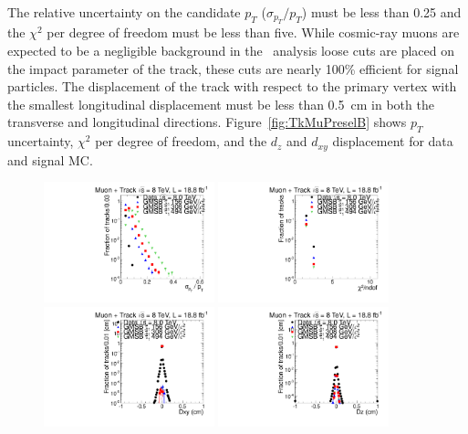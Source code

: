 The relative uncertainty on the candidate $p_T$ ($\sigma_{p_T}/p_T$) must be less than 0.25 and the $\chi^2$ per degree of freedom must be less than five.
While cosmic-ray muons are expected to be a negligible background in the \tktof\ analysis loose cuts are placed on the impact parameter of the track, 
these cuts are nearly 100\% efficient for signal particles.
The displacement of the track with respect to the primary vertex
with the smallest longitudinal displacement must be less than 0.5~cm in both the transverse and longitudinal directions.
Figure~\ref{fig:TkMuPreselB} shows $p_T$ uncertainty, $\chi^2$ per degree of freedom, and the $d_z$ and $d_{xy}$ displacement for data and signal MC.

\begin{figure}
\centering
  \includegraphics[clip=true, trim=0.0cm 0cm 2.8cm 0cm, width=0.44\textwidth]{figures/tkmu/Selection_Comp_8TeV_GMStau_Pterr_BS}
  \includegraphics[clip=true, trim=0.0cm 0cm 2.8cm 0cm, width=0.44\textwidth]{figures/tkmu/Selection_Comp_8TeV_GMStau_Chi2_BS} \\
  \includegraphics[clip=true, trim=0.0cm 0cm 2.8cm 0cm, width=0.44\textwidth]{figures/tkmu/Selection_Comp_8TeV_GMStau_Dxy_BS}
  \includegraphics[clip=true, trim=0.0cm 0cm 2.8cm 0cm, width=0.44\textwidth]{figures/tkmu/Selection_Comp_8TeV_GMStau_Dz_BS}

\end{figure}
